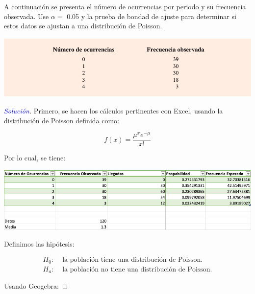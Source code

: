 \documentclass[a4paper,12pt]{article}
\newenvironment{solution}
  {\renewcommand\qedsymbol{$\square$}\begin{proof}[\textcolor{blue}{Solución}]}
  {\end{proof}}
\begin{document}
A continuación se presenta el número de ocurrencias por periodo y su frecuencia observada. Use $\alpha=$ 0.05 y la prueba de bondad de ajuste para determinar si estos datos se ajustan a una distribución de Poisson.
\begin{center}
    \includegraphics[scale=0.45]{images/Screen Shot 2021-05-11 at 11.46.10.png}
\end{center}
\begin{solution}
Primero, se hacen los cálculos pertinentes con Excel, usando la distribución de Poisson definida como: 

$$f(x)=\frac{\mu^xe^{-\mu}}{x!}$$

Por lo cual, se tiene: 
\begin{center}
    \includegraphics[scale=0.45]{images/Screen Shot 2021-05-11 at 11.47.16.png}
\end{center}

Definimos las hipótesis: 

\begin{align*}
    H_0: & \text{ la población tiene una distribución de Poisson.}\\ 
    H_a: & \text{  la población no tiene una distribución de Poisson.}
\end{align*}

Usando Geogebra: 


\end{solution}
\end{document}
